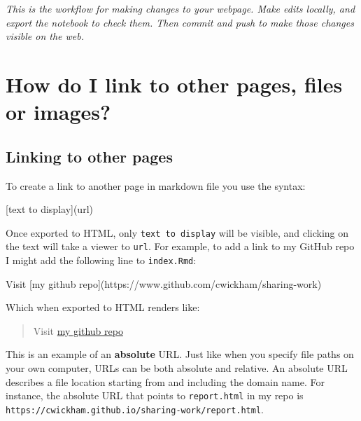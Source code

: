 \documentclass[]{Nemilov}
\newenvironment{Shaded}{\begin{snugshade}}{\end{snugshade}}
\newcommand{\NormalTok}[1]{#1}
\newcommand{\OtherTok}[1]{\textcolor[rgb]{0.56,0.35,0.01}{#1}}
\begin{document}
\emph{This is the workflow for making changes to your webpage.
Make edits locally,
and export the notebook to check them.
Then commit and push to make those changes visible on the web.}

\hypertarget{how-do-i-link-to-other-pages-files-or-images}{%
\section{How do I link to other pages, files or images?}\label{how-do-i-link-to-other-pages-files-or-images}}

\hypertarget{linking-to-other-pages}{%
\subsection{Linking to other pages}\label{linking-to-other-pages}}

To create a link to another page in markdown file you use the syntax:

\begin{Shaded}
\begin{Highlighting}[]
\OtherTok{[text to display](url)}
\end{Highlighting}
\end{Shaded}

Once exported to HTML,
only \texttt{text\ to\ display} will be visible,
and clicking on the text will take a viewer to \texttt{url}.
For example,
to add a link to my GitHub repo I might add the following line to \texttt{index.Rmd}:

\begin{Shaded}
\begin{Highlighting}[]
\NormalTok{Visit }\OtherTok{[my github repo](https://www.github.com/cwickham/sharing-work)}
\end{Highlighting}
\end{Shaded}

Which when exported to HTML renders like:

\begin{quote}
Visit \href{https://www.github.com/cwickham/sharing-work}{my github repo}
\end{quote}

This is an example of an \textbf{absolute} URL.
Just like when you specify file paths on your own computer,
URLs can be both absolute and relative.
An absolute URL describes a file location starting from and including the domain name.
For instance,
the absolute URL that points to \texttt{report.html} in my repo is \texttt{https://cwickham.github.io/sharing-work/report.html}.
\end{document}

